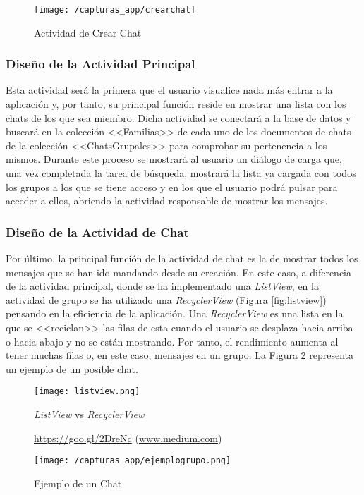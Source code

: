 \begin{figure}[!h]
	\begin{center}
		\texttt{[image: /capturas\_app/crearchat]}
		\caption{Actividad de Crear Chat}
		\label{fig:creargrupo}
	\end{center}
\end{figure}

\newpage

\subsubsection{Diseño de la Actividad Principal}
Esta actividad será la primera que el usuario visualice nada más entrar a la aplicación y, por tanto, su principal función reside en mostrar una lista con los chats de los que sea miembro. Dicha actividad se conectará a la base de datos y buscará en la colección <<Familias>> de cada uno de los documentos de chats de la colección <<ChatsGrupales>> para comprobar su pertenencia a los mismos. Durante este proceso se mostrará al usuario un diálogo de carga que, una vez completada la tarea de búsqueda, mostrará la lista ya cargada con todos los grupos a los que se tiene acceso y en los que el usuario podrá pulsar para acceder a ellos, abriendo la actividad responsable de mostrar los mensajes.

\subsubsection{Diseño de la Actividad de Chat}
Por último, la principal función de la actividad de chat es la de mostrar todos los mensajes que se han ido mandando desde su creación. En este caso, a diferencia de la actividad principal, donde se ha implementado una \textit{ListView}, en la actividad de grupo se ha utilizado una \textit{RecyclerView} (Figura \ref{fig:listview}) pensando en la eficiencia de la aplicación. Una \textit{RecyclerView} es una lista en la que se <<reciclan>> las filas de esta cuando el usuario se desplaza hacia arriba o hacia abajo y no se están mostrando. Por tanto, el rendimiento aumenta al tener muchas filas o, en este caso, mensajes en un grupo. La Figura \ref{fig:ejemplogrupo} representa un ejemplo de un posible chat.

\begin{figure}[!h]
	\centering
	\begin{minipage}{.5\textwidth}
		\centering
		\texttt{[image: listview.png]}
		\caption{\textit{ListView} vs \textit{RecyclerView}}
		\label{fig:listview}{\url{https://goo.gl/2DreNc} (\url{www.medium.com})}
	\end{minipage}%
	\begin{minipage}{.5\textwidth}
		\centering
		\texttt{[image: /capturas\_app/ejemplogrupo.png]}
		\caption{Ejemplo de un Chat}
		\label{fig:ejemplogrupo}
	\end{minipage}
\end{figure}

